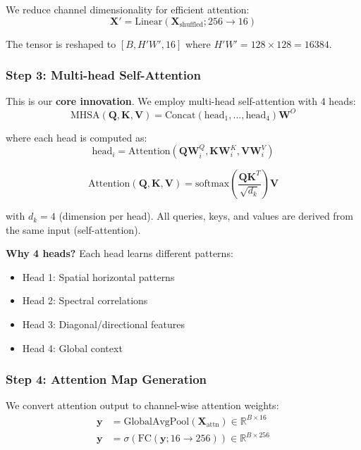 \documentclass[conference]{IEEEtran}
\begin{document}
We reduce channel dimensionality for efficient attention:
\begin{equation}
\mathbf{X}' = \text{Linear}(\mathbf{X}_{\text{shuffled}}; 256 \rightarrow 16)
\end{equation}

The tensor is reshaped to $[B, H'W', 16]$ where $H'W' = 128 \times 128 = 16384$.

\subsubsection{Step 3: Multi-head Self-Attention}

This is our \textbf{core innovation}. We employ multi-head self-attention with 4 heads:
\begin{equation}
\text{MHSA}(\mathbf{Q}, \mathbf{K}, \mathbf{V}) = \text{Concat}(\text{head}_1, ..., \text{head}_4)\mathbf{W}^O
\end{equation}

where each head is computed as:
\begin{equation}
\text{head}_i = \text{Attention}(\mathbf{Q}\mathbf{W}_i^Q, \mathbf{K}\mathbf{W}_i^K, \mathbf{V}\mathbf{W}_i^V)
\end{equation}

\begin{equation}
\text{Attention}(\mathbf{Q}, \mathbf{K}, \mathbf{V}) = \text{softmax}\left(\frac{\mathbf{Q}\mathbf{K}^T}{\sqrt{d_k}}\right)\mathbf{V}
\end{equation}

with $d_k = 4$ (dimension per head). All queries, keys, and values are derived from the same input (self-attention).

\textbf{Why 4 heads?} Each head learns different patterns:
\begin{itemize}
    \item Head 1: Spatial horizontal patterns
    \item Head 2: Spectral correlations
    \item Head 3: Diagonal/directional features
    \item Head 4: Global context
\end{itemize}

\subsubsection{Step 4: Attention Map Generation}

We convert attention output to channel-wise attention weights:
\begin{equation}
\begin{aligned}
\mathbf{y} &= \text{GlobalAvgPool}(\mathbf{X}_{\text{attn}}) \in \mathbb{R}^{B \times 16} \\
\mathbf{y} &= \sigma(\text{FC}(\mathbf{y}; 16 \rightarrow 256)) \in \mathbb{R}^{B \times 256}
\end{aligned}
\end{equation}
\end{document}
